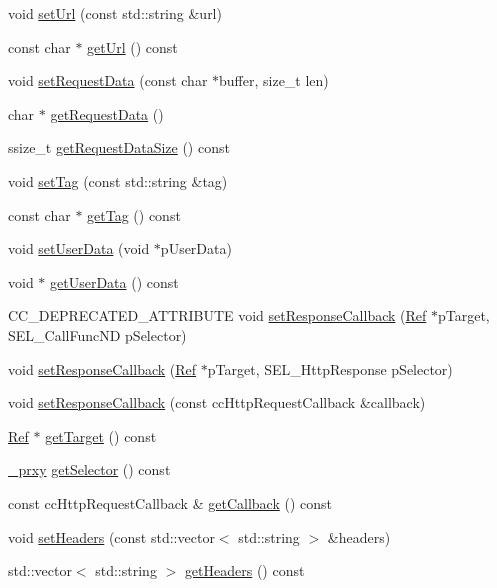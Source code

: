 \begin{DoxyCompactItemize}
\item 
void \hyperlink{classnetwork_1_1HttpRequest_a2f7663791f980b15c90c34acf281fe4a}{set\+Url} (const std\+::string \&url)
\item 
const char $\ast$ \hyperlink{classnetwork_1_1HttpRequest_a9379bae7239cf005675dfbec1db0134f}{get\+Url} () const
\item 
void \hyperlink{classnetwork_1_1HttpRequest_a819fd1cea3e4772de3ab45c6135c29e5}{set\+Request\+Data} (const char $\ast$buffer, size\+\_\+t len)
\item 
char $\ast$ \hyperlink{classnetwork_1_1HttpRequest_a13f6e9e055afd00d0f5ff3be2d791858}{get\+Request\+Data} ()
\item 
ssize\+\_\+t \hyperlink{classnetwork_1_1HttpRequest_a3e78c2a4f271bb2e5fb8f30e965d319f}{get\+Request\+Data\+Size} () const
\item 
void \hyperlink{classnetwork_1_1HttpRequest_a0e4f8ff5b153e624857183be498ef33d}{set\+Tag} (const std\+::string \&tag)
\item 
const char $\ast$ \hyperlink{classnetwork_1_1HttpRequest_a6f8026156353b462ecfa2884e0b83421}{get\+Tag} () const
\item 
void \hyperlink{classnetwork_1_1HttpRequest_a7afec412b6f1fb5ab420212f7889313d}{set\+User\+Data} (void $\ast$p\+User\+Data)
\item 
void $\ast$ \hyperlink{classnetwork_1_1HttpRequest_a54c3f127831cbe5ad995396a100972d6}{get\+User\+Data} () const
\item 
C\+C\+\_\+\+D\+E\+P\+R\+E\+C\+A\+T\+E\+D\+\_\+\+A\+T\+T\+R\+I\+B\+U\+TE void \hyperlink{classnetwork_1_1HttpRequest_a24620015312b35c28a9cb5300d969393}{set\+Response\+Callback} (\hyperlink{classRef}{Ref} $\ast$p\+Target, S\+E\+L\+\_\+\+Call\+Func\+ND p\+Selector)
\item 
void \hyperlink{classnetwork_1_1HttpRequest_a58c485555dd39dfdcbc641cfb6d3fb9a}{set\+Response\+Callback} (\hyperlink{classRef}{Ref} $\ast$p\+Target, S\+E\+L\+\_\+\+Http\+Response p\+Selector)
\item 
void \hyperlink{classnetwork_1_1HttpRequest_adc68acc891305b3066f10f4763e03748}{set\+Response\+Callback} (const cc\+Http\+Request\+Callback \&callback)
\item 
\hyperlink{classRef}{Ref} $\ast$ \hyperlink{classnetwork_1_1HttpRequest_ac372c9d736add6a9c5bdcbfda7f7f1f5}{get\+Target} () const
\item 
\hyperlink{classnetwork_1_1HttpRequest_1_1__prxy}{\+\_\+prxy} \hyperlink{classnetwork_1_1HttpRequest_abe07bda45e38e73f220bf9eb64ea7f85}{get\+Selector} () const
\item 
const cc\+Http\+Request\+Callback \& \hyperlink{classnetwork_1_1HttpRequest_abc46429ca35e9585ddb0a96a744ecee2}{get\+Callback} () const
\item 
void \hyperlink{classnetwork_1_1HttpRequest_aeb33f773e9e3f18864f1945fa3e4e2c4}{set\+Headers} (const std\+::vector$<$ std\+::string $>$ \&headers)
\item 
std\+::vector$<$ std\+::string $>$ \hyperlink{classnetwork_1_1HttpRequest_a3555ebc2bb79d38bf80a36ab9d979e6a}{get\+Headers} () const
\end{DoxyCompactItemize}
